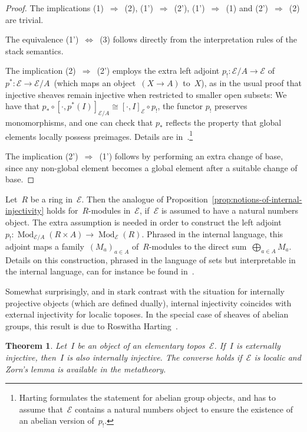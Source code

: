 \documentclass[oneside]{amsart}
\theoremstyle{definition}
\theoremstyle{plain}
\newtheorem{thm}[defn]{Theorem}
\theoremstyle{remark}
\newcommand{\E}{\mathcal{E}}
\DeclareMathOperator{\Mod}{Mod}
\renewcommand{\_}{\mathpunct{.}\,}
\begin{document}
\begin{proof}
The implications (1)~$\Rightarrow$~(2), (1')~$\Rightarrow$~(2'),
(1')~$\Rightarrow$~(1) and (2')~$\Rightarrow$~(2) are trivial.

The equivalence (1')~$\Leftrightarrow$~(3) follows directly from the
interpretation rules of the stack semantics.

The implication (2)~$\Rightarrow$~(2') employs the
extra left adjoint $p_! : \E/A \to \E$ of $p^* : \E
\to \E/A$~(which maps an object~$(X \to A)$ to~$X$), as in the usual proof that
injective sheaves remain injective when
restricted to smaller open subsets: We have that $p_* \circ [\cdot, p^*(I)]_{\E/A}
\cong [\cdot, I]_\E \circ p_!$, the functor $p_!$ preserves monomorphisms, and one
can check that $p_*$ reflects the property that global elements locally possess
preimages. Details are in~\cite[Thm.~1.1]{harting:locally-injective}.\footnote{Harting formulates
the statement for abelian group objects, and has to assume that~$\E$ contains a
natural numbers object to ensure the existence of an abelian version of~$p_!$.}

The implication (2')~$\Rightarrow$~(1') follows by performing an extra change of
base, since any non-global element becomes a global element after a suitable
change of base.
\end{proof}

Let~$R$ be a ring in~$\E$. Then the analogue of
Proposition~\ref{prop:notions-of-internal-injectivity} holds for~$R$-modules
in~$\E$, if~$\E$ is assumed to have a natural numbers object. The extra
assumption is needed in order to construct the left adjoint~$p_! :
\Mod_{\E/A}(R \times A) \to \Mod_\E(R)$. Phrased in the internal language, this
adjoint maps a family~$(M_a)_{a \in A}$ of~$R$-modules to the direct
sum~$\bigoplus_{a \in A} M_a$. Details on this construction, phrased in the
language of sets but interpretable in the internal language, can for instance
be found in~\cite[page~54]{mines-richman-ruitenburg:constructive-algebra}.

Somewhat surprisingly, and in stark contrast with the situation for internally
projective objects (which are defined dually), internal injectivity coincides
with external injectivity for localic toposes. In the special case of sheaves
of abelian groups, this result is due to Roswitha
Harting~\cite[Proposition~2.1]{harting:locally-injective}.

\begin{thm}\label{thm:injectivity-external-internal}
Let~$I$ be an object of an elementary topos~$\E$. If~$I$ is externally
injective, then~$I$ is also internally injective. The converse holds if~$\E$ is
localic and Zorn's lemma is available in the metatheory.
\end{thm}
\end{document}
